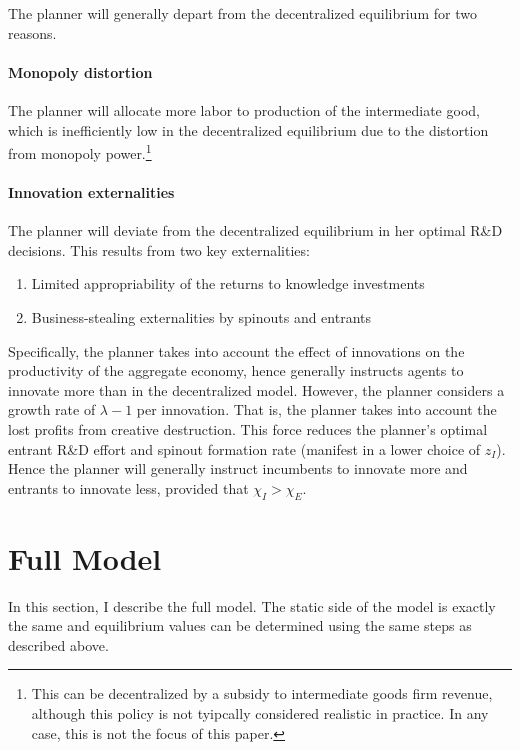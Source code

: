 \documentclass[12pt,english]{article}
\theoremstyle{remark}
\begin{document}
The planner will generally depart from the decentralized equilibrium for two reasons.

\paragraph{Monopoly distortion}
The planner will allocate more labor to production of the intermediate good, which is inefficiently low in the decentralized equilibrium due to the distortion from monopoly power.\footnote{This can be decentralized by a subsidy to intermediate goods firm revenue, although this policy is not tyipcally considered realistic in practice. In any case, this is not the focus of this paper.} 

\paragraph{Innovation externalities}

The planner will deviate from the decentralized equilibrium in her optimal R\&D decisions. This results from two key externalities: 
\begin{enumerate}
	\item Limited appropriability of the returns to knowledge investments
	\item Business-stealing externalities by spinouts and entrants
\end{enumerate}

Specifically, the planner takes into account the effect of innovations on the productivity of the aggregate economy, hence generally instructs agents to innovate more than in the decentralized model. However, the planner considers a growth rate of $\lambda - 1$ per innovation. That is, the planner takes into account the lost profits from creative destruction. This force reduces the planner's optimal entrant R\&D effort and spinout formation rate (manifest in a lower choice of $z_I$). Hence the planner will generally instruct incumbents to innovate more and entrants to innovate less, provided that $\chi_I > \chi_E$. 

\section{Full Model}\label{full_model}

In this section, I describe the full model. The static side of the model is exactly the same and equilibrium values can be determined using the same steps as described above.
\end{document}
